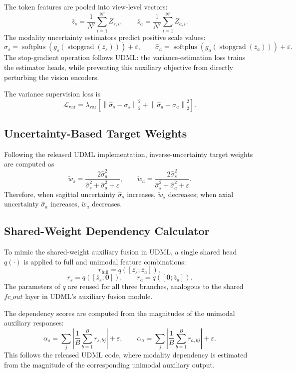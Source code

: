 The token features are pooled into view-level vectors:
\[
    \bar{z}_s = \frac{1}{N'}\sum_{i=1}^{N'} Z_{s,i},
    \qquad
    \bar{z}_a = \frac{1}{N'}\sum_{i=1}^{N'} Z_{a,i}.
\]
The modality uncertainty estimators predict positive scale values:
\[
    \hat{\sigma}_s
    =
    \operatorname{softplus}
    \left(
        g_s(\operatorname{stopgrad}(\bar{z}_s))
    \right)
    + \varepsilon,
    \qquad
    \hat{\sigma}_a
    =
    \operatorname{softplus}
    \left(
        g_a(\operatorname{stopgrad}(\bar{z}_a))
    \right)
    + \varepsilon.
\]
The stop-gradient operation follows UDML: the variance-estimation loss trains the estimator heads, while preventing this auxiliary objective from directly perturbing the vision encoders.

The variance supervision loss is
\[
    \mathcal{L}_{\text{var}}
    =
    \lambda_{\text{var}}
    \left[
        \left\lVert \hat{\sigma}_s - \sigma_s \right\rVert_2^2
        +
        \left\lVert \hat{\sigma}_a - \sigma_a \right\rVert_2^2
    \right].
\]

\subsection{Uncertainty-Based Target Weights}

Following the released UDML implementation, inverse-uncertainty target weights are computed as
\[
    \tilde{w}_s
    =
    \frac{2\hat{\sigma}_a^2}
         {\hat{\sigma}_s^2+\hat{\sigma}_a^2+\varepsilon},
    \qquad
    \tilde{w}_a
    =
    \frac{2\hat{\sigma}_s^2}
         {\hat{\sigma}_s^2+\hat{\sigma}_a^2+\varepsilon}.
\]
Therefore, when sagittal uncertainty \(\hat{\sigma}_s\) increases, \(\tilde{w}_s\) decreases; when axial uncertainty \(\hat{\sigma}_a\) increases, \(\tilde{w}_a\) decreases.

\subsection{Shared-Weight Dependency Calculator}

To mimic the shared-weight auxiliary fusion in UDML, a single shared head \(q(\cdot)\) is applied to full and unimodal feature combinations:
\[
    r_{\text{full}} = q([\bar{z}_s;\bar{z}_a]),
\]
\[
    r_s = q([\bar{z}_s;\mathbf{0}]),
    \qquad
    r_a = q([\mathbf{0};\bar{z}_a]).
\]
The parameters of \(q\) are reused for all three branches, analogous to the shared \(fc\_out\) layer in UDML's auxiliary fusion module.

The dependency scores are computed from the magnitudes of the unimodal auxiliary responses:
\[
    \alpha_s
    =
    \sum_j
    \left|
        \frac{1}{B}\sum_{b=1}^{B} r_{s,bj}
    \right|
    + \varepsilon,
    \qquad
    \alpha_a
    =
    \sum_j
    \left|
        \frac{1}{B}\sum_{b=1}^{B} r_{a,bj}
    \right|
    + \varepsilon.
\]
This follows the released UDML code, where modality dependency is estimated from the magnitude of the corresponding unimodal auxiliary output.


